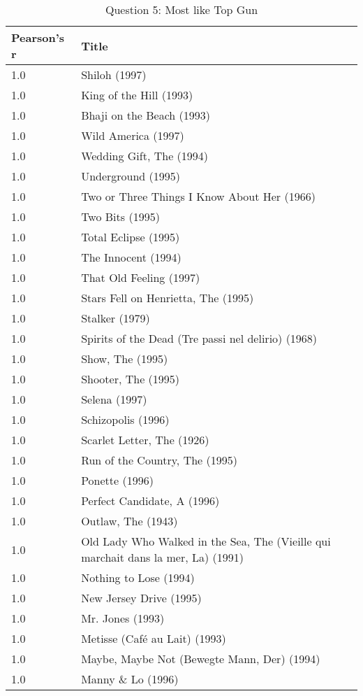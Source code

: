 \begin{table}[h!]
\centering
\begin{tabular}{| l | l |}
\hline
Pearson's r & Title \\
\hline
1.0 & Shiloh (1997) \\
1.0 & King of the Hill (1993) \\
1.0 & Bhaji on the Beach (1993) \\
1.0 & Wild America (1997) \\
1.0 & Wedding Gift, The (1994) \\
1.0 & Underground (1995) \\
1.0 & Two or Three Things I Know About Her (1966) \\
1.0 & Two Bits (1995) \\
1.0 & Total Eclipse (1995) \\
1.0 & The Innocent (1994) \\
1.0 & That Old Feeling (1997) \\
1.0 & Stars Fell on Henrietta, The (1995) \\
1.0 & Stalker (1979) \\
1.0 & Spirits of the Dead (Tre passi nel delirio) (1968) \\
1.0 & Show, The (1995) \\
1.0 & Shooter, The (1995) \\
1.0 & Selena (1997) \\
1.0 & Schizopolis (1996) \\
1.0 & Scarlet Letter, The (1926) \\
1.0 & Run of the Country, The (1995) \\
1.0 & Ponette (1996) \\
1.0 & Perfect Candidate, A (1996) \\
1.0 & Outlaw, The (1943) \\
1.0 & Old Lady Who Walked in the Sea, The (Vieille qui marchait dans la mer, La) (1991) \\
1.0 & Nothing to Lose (1994) \\
1.0 & New Jersey Drive (1995) \\
1.0 & Mr. Jones (1993) \\
1.0 & Metisse (Café au Lait) (1993) \\
1.0 & Maybe, Maybe Not (Bewegte Mann, Der) (1994) \\
1.0 & Manny \& Lo (1996) \\
\hline
\end{tabular}
\caption{Question 5: Most like Top Gun}
\label{tab:mltg1}
\end{table}

